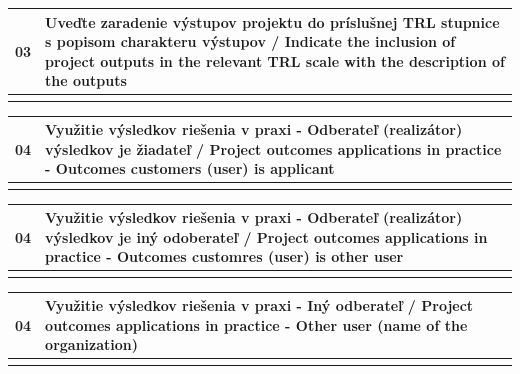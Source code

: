 \documentclass[9pt,a4paper]{extarticle}
\newcommand{\WideField}[4]{\noindent\begin{tabularx}{\textwidth}{|>{\columncolor{shade}}p{7mm}|>{\columncolor{shade}}X|}\hline
#1 & \textbf{#2} / #3 \\ \hline\multicolumn{2}{|p{\dimexpr\textwidth-2\tabcolsep-2\arrayrulewidth\relax}|}{#4}\\\hline\end{tabularx}\par\vspace{-1pt}}
\begin{document}
\WideField{03}{Uveďte zaradenie výstupov projektu do príslušnej TRL stupnice s popisom charakteru výstupov}{Indicate the inclusion of project outputs in the relevant TRL scale with the description of the outputs}{Výstupy projektu SOUND-EDGE budú zodpovedať úrovni technologickej pripravenosti TRL 3 – experimentálne overenie princípu. Hlavnými výstupmi budú návrh softvérovej architektúry a optimalizované modely TinyML na detekciu anomálií v akustických a vibračných signáloch priemyselných zariadení. Funkčnosť navrhovaného riešenia bude overená prostredníctvom simulačných experimentov na verejne dostupných datasetoch NASA IMS, MIMII a ToyADMOS. Vyhodnocovaná bude úspešnosť detekcie, pamäťová náročnosť modelov, čas spracovania a objem prenášaných dát. Projekt sa zameriava na experimentálne overenie technologického princípu v simulačnom prostredí. Dosiahnuté výsledky vytvoria základ pre následný vývoj integrovaného prototypu a jeho budúce laboratórne a priemyselné overenie.

/

The expected outputs of the SOUND-EDGE project correspond to Technology Readiness Level TRL 3 – experimental proof of concept. The main outputs will include a software architecture design and optimized TinyML models for anomaly detection in acoustic and vibration signals from industrial machinery. The proposed solution will be evaluated through simulation experiments using publicly available datasets NASA IMS, MIMII, and ToyADMOS. Evaluation will focus on detection performance, model memory requirements, processing latency, and transmitted data volume. The project focuses on experimentally validating the technological concept in a simulation environment. The achieved results will provide a foundation for the subsequent development of an integrated prototype and its future validation in laboratory and industrial environments.}
\WideField{04}{Využitie výsledkov riešenia v praxi - Odberateľ (realizátor) výsledkov je žiadateľ}{Project outcomes applications in practice - Outcomes customers (user) is applicant}{Áno/Yes}
\WideField{04}{Využitie výsledkov riešenia v praxi - Odberateľ (realizátor) výsledkov je iný odoberateľ}{Project outcomes applications in practice - Outcomes customres (user) is other user}{Nie/No}
\WideField{04}{Využitie výsledkov riešenia v praxi - Iný odberateľ}{Project outcomes applications in practice - Other user (name of the organization)}{}
\end{document}

